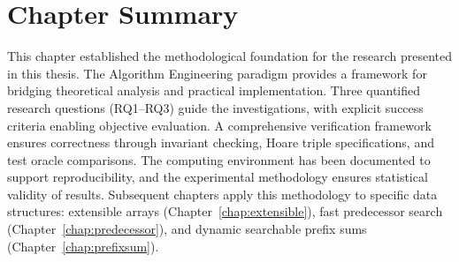 \section{Chapter Summary}

This chapter established the methodological foundation for the research presented in this thesis. The Algorithm Engineering paradigm provides a framework for bridging theoretical analysis and practical implementation. Three quantified research questions (RQ1--RQ3) guide the investigations, with explicit success criteria enabling objective evaluation. A comprehensive verification framework ensures correctness through invariant checking, Hoare triple specifications, and test oracle comparisons. The computing environment has been documented to support reproducibility, and the experimental methodology ensures statistical validity of results. Subsequent chapters apply this methodology to specific data structures: extensible arrays (Chapter~\ref{chap:extensible}), fast predecessor search (Chapter~\ref{chap:predecessor}), and dynamic searchable prefix sums (Chapter~\ref{chap:prefixsum}).
